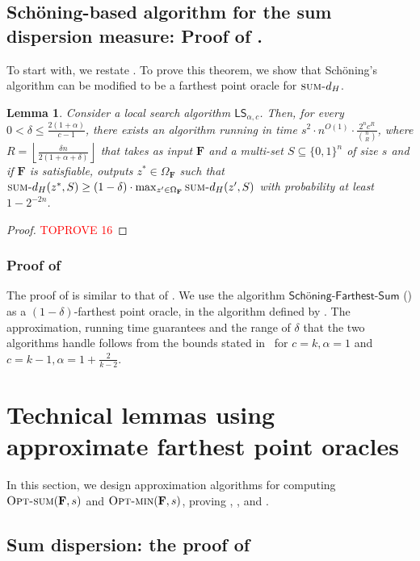 \documentclass[11pt, letterpaper]{article}
\newtheorem{lemma}[theorem]{Lemma}
\theoremstyle{definition}
\newcommand{\f}{\mathbf{F}}
\newcommand{\Om}{\Omega_{\f}}
\newcommand{\LS}{\textsf{LS}}
\newcommand{\sumd}{\textsc{sum-}d_H}
\newcommand{\opts}{\textsc{Opt-sum}}
\newcommand{\optm}{\textsc{Opt-min}}
\newcommand{\sch}{Sch\"{o}ning\xspace}
\newcommand{\floor}[1]{{\left\lfloor{#1}\right\rfloor}}
\begin{document}
\subsection{\sch-based algorithm for the sum dispersion measure: Proof of .}
\label{app:schsum}
To start with, we restate . 
\schopts*
To prove this theorem, we show that \sch's algorithm can be modified to be a farthest point oracle for $\sumd$. 
\begin{lemma} \label{lem:schFarthestSum}
    Consider a local search algorithm $\LS_{\alpha, c}$. Then, for every $0 < \delta \leq \frac{2(1+\alpha)}{c-1}$, there exists an algorithm  running in time $s^2 \cdot n^{O(1)} \cdot \frac{2^n c^{R}}{\binom{n}{R} }$, where $R=\floor{\frac{\delta n}{2(1+\alpha+\delta)}}$ that takes as input $\f$ and a multi-set $S \subseteq \{0,1\}^n$ of size $s$ and if $\f$ is satisfiable, outputs $z^* \in \Om$ such that $\sumd(z^*, S) \geq \left(1-\delta\right) \cdot \max_{z' \in \Om} \sumd(z', S)$ with probability at least $1-2^{-2n}$. 
 \end{lemma}
 
 \begin{proof}\textcolor{red}{TOPROVE 16}\end{proof}

\subsubsection*{Proof of }
The proof of  is similar to that of . We use the algorithm $\textsf{\sch-Farthest-Sum}$ () as a $(1-\delta)$-farthest point oracle, in the algorithm defined by . The approximation, running time guarantees and the range of $\delta$ that the two algorithms handle follows from the bounds stated in~ for $c=k, \alpha=1$ and $c=k-1, \alpha=1+\frac{2}{k-2}$.  \section{Technical lemmas using approximate farthest point oracles}\label{sec:approxfarthest}
\label{sec:dispersion}
In this section, we design approximation algorithms for computing $\opts(\f,s)$ and $\optm(\f,s)$, proving , ,  and . 

\subsection{Sum dispersion: the proof of }
\end{document}
